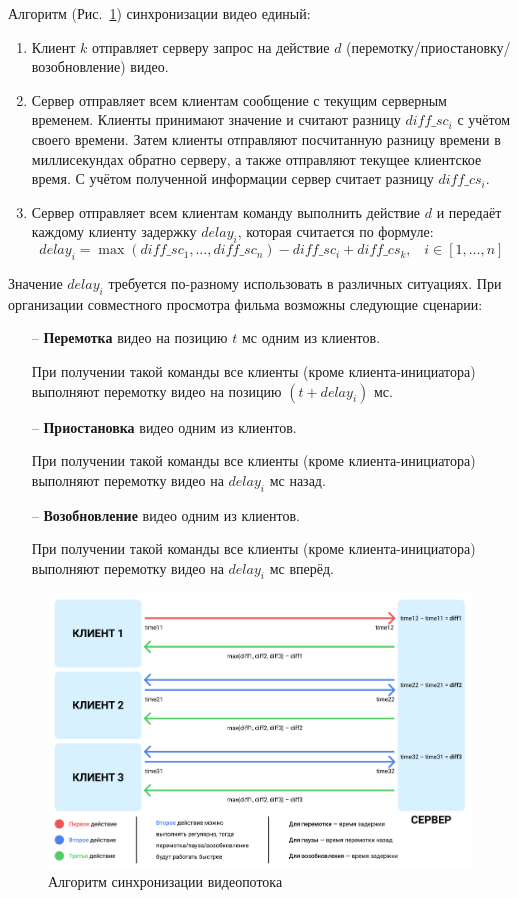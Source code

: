 Алгоритм (Рис.~\ref{ris:interaction_format}) синхронизации видео единый:
\begin{enumerate}
    \item Клиент \(k\) отправляет серверу запрос на действие \(d\) (перемотку/приостановку/возобновление) видео.
    \item Сервер отправляет всем клиентам сообщение с текущим серверным временем.
    Клиенты принимают значение и считают разницу \(diff\_sc_i\) с учётом своего времени.
    Затем клиенты отправляют посчитанную разницу времени в миллисекундах обратно серверу, а также отправляют текущее клиентское время.
    С учётом полученной информации сервер считает разницу \(diff\_cs_i\).
    \item Сервер отправляет всем клиентам команду выполнить действие \(d\) и передаёт каждому клиенту задержку \(delay_i\),
    которая считается по формуле: \[ delay_i = \max(diff\_sc_1, \ldots, diff\_sc_n) - diff\_sc_i + diff\_cs_k, \;\;\; i \in [1, \ldots, n] \]
\end{enumerate}

Значение \(delay_i\) требуется по-разному использовать в различных ситуациях.
При организации совместного просмотра фильма возможны следующие сценарии:
\begin{itemize}
    \item[--] \textbf{Перемотка} видео на позицию \(t\) мс одним из клиентов.

    При получении такой команды все клиенты (кроме клиента-инициатора) выполняют перемотку видео на позицию \((t + delay_i)\) мс.
    \item[--] \textbf{Приостановка} видео одним из клиентов.

    При получении такой команды все клиенты (кроме клиента-инициатора) выполняют перемотку видео на \(delay_i\) мс назад.
    \item[--] \textbf{Возобновление} видео одним из клиентов.

    При получении такой команды все клиенты (кроме клиента-инициатора) выполняют перемотку видео на \(delay_i\) мс вперёд.
\end{itemize}

\begin{figure}[h]
    \centering
    \includegraphics[width=1\linewidth]{images/interaction_format.png}
    \caption{Алгоритм синхронизации видеопотока}
    \label{ris:interaction_format}
\end{figure}

